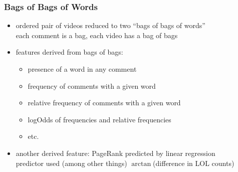 \documentclass[fleqn]{beamer}
\begin{document}
\begin{frame}
\frametitle{Bags of Bags of Words}
     \begin{itemize}
         \item ordered pair of videos reduced to two ``bags of bags of words''  \\
                  each comment is a bag, each video has a bag of bags

         \item features derived from bags of bags:
             \begin{itemize}
                 \item presence of a word in any comment
                 \item frequency of comments with a given word
                 \item relative frequency of comments with a given word
                 \item  logOdds of frequencies and relative frequencies
                 \item etc.
              \end{itemize}
         
         \item another derived feature: PageRank predicted by linear regression\\ 
                  predictor used (among other things) $\arctan$(difference in LOL counts)
     
     \end{itemize}
\end{frame}
\end{document}
